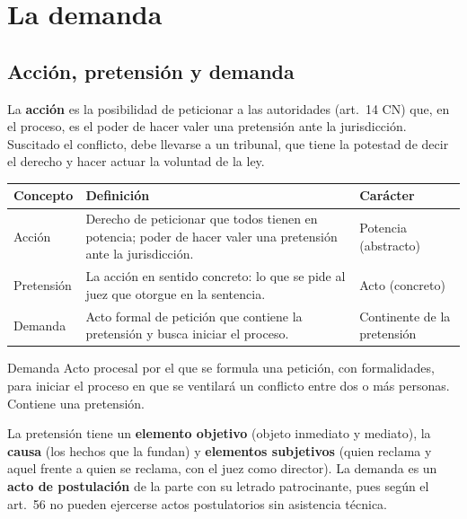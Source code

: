 \documentclass[12pt,oneside]{book}
\renewcommand{\arraystretch}{1.15}
\begin{document}
\chapter{La demanda}
\label{cap:demanda}

\section{Acción, pretensión y demanda}

La \textbf{acción} es la posibilidad de peticionar a las autoridades (art.~14 CN) que, en el proceso, es el poder de hacer valer una pretensión ante la jurisdicción. Suscitado el conflicto, debe llevarse a un tribunal, que tiene la potestad de decir el derecho y hacer actuar la voluntad de la ley.

\begin{table}[H]
\centering
\renewcommand{\arraystretch}{1.25}
\begin{tabularx}{\textwidth}{>{\RaggedRight\arraybackslash}p{}>{\RaggedRight\arraybackslash}X>{\RaggedRight\arraybackslash}p{}}
\toprule
\textbf{Concepto} & \textbf{Definición} & \textbf{Carácter} \\
\midrule
Acción & Derecho de peticionar que todos tienen en potencia; poder de hacer valer una pretensión ante la jurisdicción. & Potencia (abstracto) \\
Pretensión & La acción en sentido concreto: lo que se pide al juez que otorgue en la sentencia. & Acto (concreto) \\
Demanda & Acto formal de petición que contiene la pretensión y busca iniciar el proceso. & Continente de la pretensión \\
\bottomrule
\end{tabularx}
\end{table}

\begin{definicion}{Demanda}
Acto procesal por el que se formula una petición, con formalidades, para iniciar el proceso en que se ventilará un conflicto entre dos o más personas. Contiene una pretensión.
\end{definicion}

La pretensión tiene un \textbf{elemento objetivo} (objeto inmediato y mediato), la \textbf{causa} (los hechos que la fundan) y \textbf{elementos subjetivos} (quien reclama y aquel frente a quien se reclama, con el juez como director). La demanda es un \textbf{acto de postulación} de la parte con su letrado patrocinante, pues según el art.~56 no pueden ejercerse actos postulatorios sin asistencia técnica.
\end{document}

